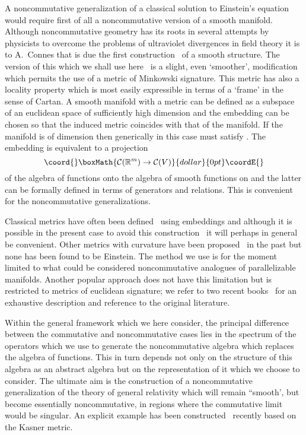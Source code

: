 \documentclass[12pt,a4paper]{article}
\newcounter{eg}
\def\b#1{{\mathbb #1}}
\def\c#1{{\cal #1}}
\begin{document}
A noncommutative generalization of a classical solution to Einstein's
equation would require first of all a noncommutative version of a
smooth manifold. Although noncommutative geometry has its roots in
several attempts by physicists to overcome the problems of ultraviolet
divergences in field theory it is to A.~Connes that is due the first
construction~\cite{Con94} of a smooth structure. The version of this
which we shall use here~\cite{Mad00c} is a slight, even `smoother',
modification which permits the use of a metric of Minkowski signature.
This metric has also a locality property which is most easily
expressible in terms of a `frame' in the sense of Cartan. A smooth
manifold \coordHE{} with a metric can be defined as a subspace of an
euclidean space \myHighlight{$\b{R}^m$}\coordHE{} of sufficiently high dimension \coordHE{} and the
embedding can be chosen so that the induced metric coincides with that
of the manifold. If the manifold is of dimension \coordHE{} then generically
in this case \coordHE{} must satisfy \coordHE{}. The embedding is
equivalent to a projection 
$$\coord{}\boxMath{
\c{C}(\b{R}^m) \rightarrow \c{C}(V)
}{dollar}{0pt}\coordE{}$$
of the algebra of functions \myHighlight{$\c{C}(\b{R}^m)$}\coordHE{} onto the algebra
\myHighlight{$\c{C}(V)$}\coordHE{} of smooth functions on \coordHE{} and the latter can be formally
defined in terms of generators and relations.  This is convenient for
the noncommutative generalizations. 

Classical metrics have often been
defined~\cite{LidRomTavRip97,PavTap01} using embeddings and although
it is possible in the present case to avoid this
construction~\cite{DesPirRob76} it will perhaps in general
be convenient.  Other metrics with curvature have been
proposed~\cite{Mad89c,AscCas93} in the past but none
has been found to be Einstein. The method we use is for the moment
limited to what could be considered noncommutative analogues of
parallelizable manifolds. Another popular approach does not have this
limitation but is restricted to metrics of euclidean signature; we
refer to two recent books~\cite{Lan97,FigGraVar00} for an exhaustive
description and reference to the original literature.

Within the general framework which we here consider, the principal
difference between the commutative and noncommutative cases lies in
the spectrum of the operators which we use to generate the
noncommutative algebra which replaces the algebra of functions. This
in turn depends not only on the structure of this algebra as an abstract
algebra but on the representation of it which we choose to
consider. The ultimate aim is the construction of a noncommutative
generalization of the theory of general relativity which will remain
``smooth', but become essentially noncommutative, in regions where the
commutative limit would be singular. An explicit example has been
constructed~\cite{MacMadZou02} recently based on the Kasner metric.
\end{document}
